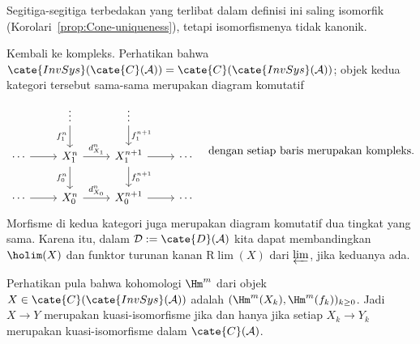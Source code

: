 Segitiga-segitiga terbedakan yang terlibat dalam definisi ini saling isomorfik
(Korolari~\ref{prop:Cone-uniqueness}), tetapi isomorfismenya tidak kanonik.

Kembali ke kompleks. Perhatikan bahwa
$\cate{InvSys}(\cate{C}(\mathcal{A}))=
\cate{C}(\cate{InvSys}(\mathcal{A}))$; objek kedua kategori tersebut sama-sama
merupakan diagram komutatif
\[\begin{tikzcd}
	& \vdots \arrow[d, "{f_1^n}"'] & \vdots \arrow[d, "{f_1^{n+1}}"] & \\
	\cdots \arrow[r] & X_1^n \arrow[r, "{d_{X_1}^n}"] \arrow[d, "{f_0^n}"'] & X_1^{n+1} \arrow[d, "{f_0^{n+1}}"] \arrow[r] & \cdots \\
	\cdots \arrow[r] & X_0^n \arrow[r, "{d_{X_0}^n}"] & X_0^{n+1} \arrow[r] & \cdots
\end{tikzcd} \quad \text{dengan setiap baris merupakan kompleks}. \]
Morfisme di kedua kategori juga merupakan diagram komutatif dua tingkat yang
sama. Karena itu, dalam $\mathcal{D}:=\cate{D}(\mathcal{A})$ kita dapat
membandingkan $\holim(X)$ dan funktor turunan kanan
$\mathrm{R}\lim(X)$ dari $\varprojlim$, jika keduanya ada.

Perhatikan pula bahwa kohomologi $\Hm^m$ dari objek
$X\in\cate{C}(\cate{InvSys}(\mathcal{A}))$ adalah
$(\Hm^m(X_k),\Hm^m(f_k))_{k\geq0}$. Jadi $X\to Y$ merupakan
kuasi-isomorfisme jika dan hanya jika setiap $X_k\to Y_k$ merupakan
kuasi-isomorfisme dalam $\cate{C}(\mathcal{A})$.

